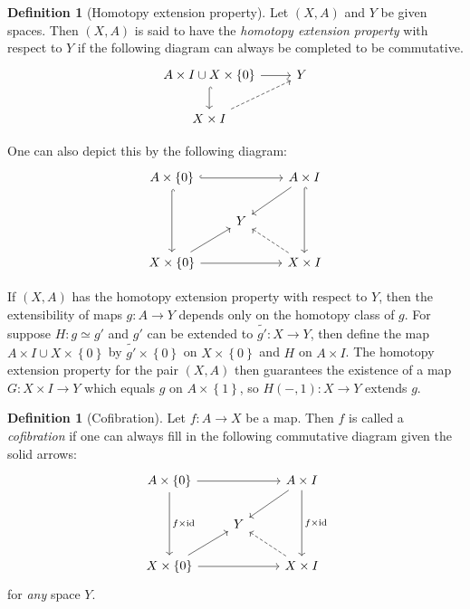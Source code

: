 \documentclass[reqno]{amsart}
\theoremstyle{definition}
\newtheorem{definition}[theorem]{Definition}
\theoremstyle{remark}
\newcommand{\id}{{\mathrm{id}}}
\begin{document}
\begin{definition}[Homotopy extension property]
    Let $\left( X,A \right) $ and $Y $ be given spaces.
    Then $\left( X, A \right) $ is said to have
    the \textit{homotopy extension property} with respect to
    $Y$ if the following diagram can always be completed
    to be commutative.
    \begin{equation*}
    \begin{tikzcd}
        A \times I \cup X \times \left\{ 0 \right\} 
        \ar[r] \ar[d, hookrightarrow] & Y\\
        X \times I \ar[ru, dashed]
    \end{tikzcd}
    \end{equation*}

    One can also depict this by the following diagram:
    \begin{equation*}
    \begin{tikzcd}
        A \times \left\{ 0 \right\} \ar[rr, hookrightarrow]
        \ar[dd, hookrightarrow] 
        & & A \times I \ar[dd, hookrightarrow] \ar[ld] \\
        & Y & \\
        X \times \left\{ 0 \right\} \ar[ru] \ar[rr] && X \times I
        \ar[lu, dashed]
    \end{tikzcd}
    \end{equation*}
\end{definition}

If $\left( X,A \right) $ has the homotopy extension property
with respect to $Y$, then the extensibility of maps
$g \colon A \to Y$ depends only on the homotopy class of
$g$. For suppose $H \colon g \simeq g'$ and $g'$ can be
extended to  $\tilde{g'} \colon X \to Y$, 
then define the map
$A \times I \cup  X \times \left\{ 0 \right\} $ by
$\tilde{g'} \times \left\{ 0 \right\} $ on
$X \times \left\{ 0 \right\} $ and
$H$ on $A \times I$. The homotopy extension property for the
pair $(X,A)$ then guarantees the existence of a map
$G \colon X \times I \to Y$ which equals
$g$ on $A \times \left\{ 1 \right\} $, so
$H \left( -,1 \right) \colon X \to Y$ extends $g$.

\begin{definition}[Cofibration]
    Let $f \colon A \to X$ be a map. Then $f$ is called
    a \textit{cofibration} if one can always fill in the following
    commutative diagram given the solid arrows:
    \begin{equation*}
    \begin{tikzcd}
        A \times \left\{ 0 \right\} \ar[dd, "f \times \id"] 
        \ar[rr]
        & & A\times I \ar[dd, "f \times \id"] \ar[dl] \\
            & Y &\\
        X \times \left\{ 0 \right\} \ar[ru]
        \ar[rr]& & X \times I 
        \ar[lu, dashed]
    \end{tikzcd}
    \end{equation*}
    for \textit{any} space $Y$.
\end{definition}
\end{document}
